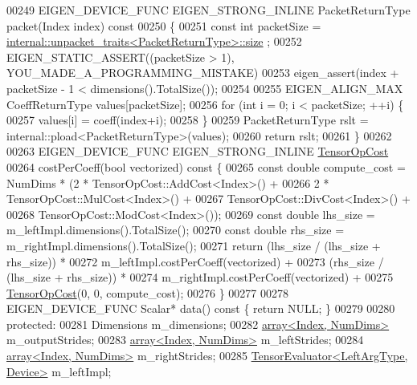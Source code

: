 \begin{DoxyCode}
00249   EIGEN\_DEVICE\_FUNC EIGEN\_STRONG\_INLINE PacketReturnType packet(Index index)\textcolor{keyword}{ const}
00250 \textcolor{keyword}{  }\{
00251     \textcolor{keyword}{const} \textcolor{keywordtype}{int} packetSize = \hyperlink{struct_eigen_1_1internal_1_1unpacket__traits}{internal::unpacket\_traits<PacketReturnType>::size}
      ;
00252     EIGEN\_STATIC\_ASSERT((packetSize > 1), YOU\_MADE\_A\_PROGRAMMING\_MISTAKE)
00253     eigen\_assert(index + packetSize - 1 < dimensions().TotalSize());
00254 
00255     EIGEN\_ALIGN\_MAX CoeffReturnType values[packetSize];
00256     \textcolor{keywordflow}{for} (\textcolor{keywordtype}{int} i = 0; i < packetSize; ++i) \{
00257       values[i] = coeff(index+i);
00258     \}
00259     PacketReturnType rslt = internal::pload<PacketReturnType>(values);
00260     \textcolor{keywordflow}{return} rslt;
00261   \}
00262 
00263   EIGEN\_DEVICE\_FUNC EIGEN\_STRONG\_INLINE \hyperlink{class_eigen_1_1_tensor_op_cost}{TensorOpCost}
00264   costPerCoeff(\textcolor{keywordtype}{bool} vectorized)\textcolor{keyword}{ const }\{
00265     \textcolor{keyword}{const} \textcolor{keywordtype}{double} compute\_cost = NumDims * (2 * TensorOpCost::AddCost<Index>() +
00266                                            2 * TensorOpCost::MulCost<Index>() +
00267                                            TensorOpCost::DivCost<Index>() +
00268                                            TensorOpCost::ModCost<Index>());
00269     \textcolor{keyword}{const} \textcolor{keywordtype}{double} lhs\_size = m\_leftImpl.dimensions().TotalSize();
00270     \textcolor{keyword}{const} \textcolor{keywordtype}{double} rhs\_size = m\_rightImpl.dimensions().TotalSize();
00271     \textcolor{keywordflow}{return} (lhs\_size / (lhs\_size + rhs\_size)) *
00272                m\_leftImpl.costPerCoeff(vectorized) +
00273            (rhs\_size / (lhs\_size + rhs\_size)) *
00274                m\_rightImpl.costPerCoeff(vectorized) +
00275            \hyperlink{class_eigen_1_1_tensor_op_cost}{TensorOpCost}(0, 0, compute\_cost);
00276   \}
00277 
00278   EIGEN\_DEVICE\_FUNC Scalar* data()\textcolor{keyword}{ const }\{ \textcolor{keywordflow}{return} NULL; \}
00279 
00280   \textcolor{keyword}{protected}:
00281     Dimensions m\_dimensions;
00282     \hyperlink{class_eigen_1_1array}{array<Index, NumDims>} m\_outputStrides;
00283     \hyperlink{class_eigen_1_1array}{array<Index, NumDims>} m\_leftStrides;
00284     \hyperlink{class_eigen_1_1array}{array<Index, NumDims>} m\_rightStrides;
00285     \hyperlink{struct_eigen_1_1_tensor_evaluator}{TensorEvaluator<LeftArgType, Device>} m\_leftImpl;

\end{DoxyCode}
